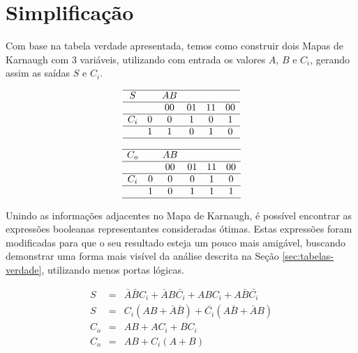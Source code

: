 \documentclass{article}
\newcommand{\n}[1]{\bar{#1}}
\begin{document}
\section{Simplificação}
\label{sec:simplificacao}

Com base na tabela verdade apresentada, temos como construir dois Mapas de
Karnaugh com 3 variáveis, utilizando com entrada os valores $A$, $B$ e $C_i$,
gerando assim as saídas $S$ e $C_i$.

\begin{equation*}
    \begin{array}{cccccc}
        \hline S    &   & AB &    &    &   \\
        \hline      &   & 00 & 01 & 11 & 00\\
        \hline C_i  & 0 &  0 &  1 &  0 &  1\\
        \hline      & 1 &  1 &  0 &  1 &  0\\
        \hline
    \end{array}
\end{equation*}

\begin{equation*}
    \begin{array}{cccccc}
        \hline C_o  &   & AB &    &    &   \\
        \hline      &   & 00 & 01 & 11 & 00\\
        \hline C_i  & 0 &  0 &  0 &  1 &  0\\
        \hline      & 1 &  0 &  1 &  1 &  1\\
        \hline
    \end{array}
\end{equation*}

Unindo as informações adjacentes no Mapa de Karnaugh, é possível encontrar as
expressões booleanas representantes consideradas ótimas. Estas expressões foram
modificadas para que o seu resultado esteja um pouco mais amigável, buscando
demonstrar uma forma mais visível da análise descrita na Seção
\ref{sec:tabelas-verdade}, utilizando menos portas lógicas.

\begin{eqnarray*}
    S   &=& \n{A}\n{B}C_i + \n{A}B\n{C_i} + ABC_i + A\n{B}\n{C_i}\\
    S   &=& C_i(AB + \n{A}\n{B}) + \n{C_i}(A\n{B} + \n{A}B)\\
    C_o &=& AB + AC_i + BC_i\\
    C_o &=& AB + C_i(A + B)
\end{eqnarray*}
\end{document}
